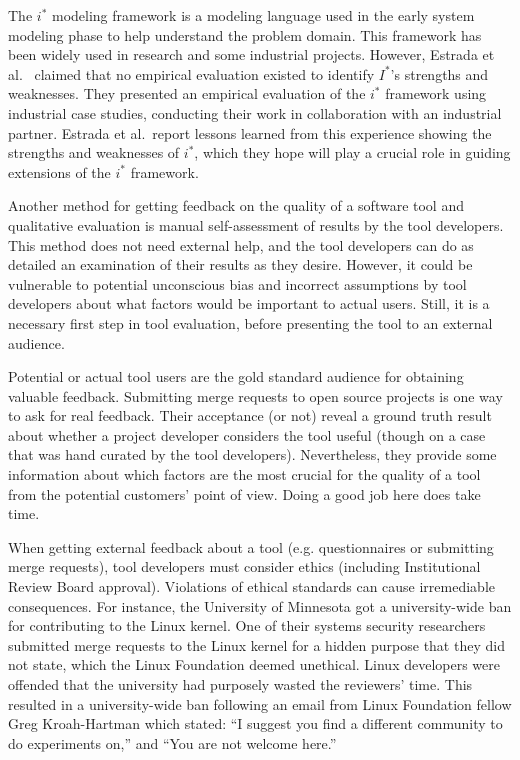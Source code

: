 The $i^*$ modeling framework is a modeling language used in the early
system modeling phase to help understand the problem domain. This
framework has been widely used in research and some industrial
projects. However, Estrada et
al.~\cite{estrada06:_empir_evaluat_framew_model_based} claimed that no
empirical evaluation existed to identify $I^*$'s strengths and
weaknesses. They presented an empirical evaluation of the $i^*$
framework using industrial case studies, conducting their work in
collaboration with an industrial partner. Estrada et al.~report
lessons learned from this experience showing the strengths and
weaknesses of $i^*$, which they hope will play a crucial role in
guiding extensions of the $i^*$ framework.


Another method for getting feedback on the quality of a software tool
and qualitative evaluation is manual self-assessment of results by the
tool developers. This method does not need external help, and the tool
developers can do as detailed an examination of their results as they
desire.  However, it could be vulnerable to potential unconscious bias
and incorrect assumptions by tool developers about what factors would be
important to actual users. Still, it is a necessary first step in tool
evaluation, before presenting the tool to an external audience.

Potential or actual tool users are the gold standard audience for
obtaining valuable feedback. Submitting merge requests to open source
projects is one way to ask for real feedback. Their acceptance (or
not) reveal a ground truth result about whether a project developer
considers the tool useful (though on a case that was hand curated by
the tool developers). Nevertheless, they provide some information
about which factors are the most crucial for the quality of a tool
from the potential customers' point of view. Doing a good job here
does take time.

When getting external feedback about a tool (e.g. questionnaires or
submitting merge requests), tool developers must consider ethics
(including Institutional Review Board approval). Violations of ethical
standards can cause irremediable consequences. For instance, the
University of Minnesota got a university-wide ban for contributing to
the Linux kernel. One of their systems security researchers submitted
merge requests to the Linux kernel for a hidden purpose that they did
not state, which the Linux Foundation deemed
unethical. Linux developers were offended that the university had purposely
wasted the reviewers' time. This resulted in a university-wide ban
following an email from Linux Foundation fellow Greg Kroah-Hartman
which stated: ``I suggest you find a different community to do
experiments on,'' and ``You are not welcome
here.''~\cite{minnesota_banned}


